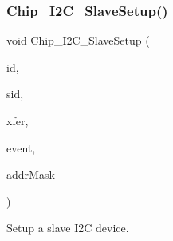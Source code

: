 \subsubsection{\texorpdfstring{Chip\+\_\+\+I2\+C\+\_\+\+Slave\+Setup()}{Chip\_I2C\_SlaveSetup()}}
{\footnotesize\ttfamily void Chip\+\_\+\+I2\+C\+\_\+\+Slave\+Setup (\begin{DoxyParamCaption}\item[{\hyperlink{group___i2_c__18_x_x__43_x_x_ga957556a4d900506cd4cba8427afd81e6}{I2\+C\+\_\+\+I\+D\+\_\+T}}]{id,  }\item[{\hyperlink{group___i2_c__18_x_x__43_x_x_ga5fb1ba338fb3822bb6ca012adc4194bf}{I2\+C\+\_\+\+S\+L\+A\+V\+E\+\_\+\+ID}}]{sid,  }\item[{\hyperlink{struct_i2_c___x_f_e_r___t}{I2\+C\+\_\+\+X\+F\+E\+R\+\_\+T} $\ast$}]{xfer,  }\item[{\hyperlink{group___i2_c__18_x_x__43_x_x_gaef152f4dc1487d90573810007489082e}{I2\+C\+\_\+\+E\+V\+E\+N\+T\+H\+A\+N\+D\+L\+E\+R\+\_\+T}}]{event,  }\item[{uint8\+\_\+t}]{addr\+Mask }\end{DoxyParamCaption})}



Setup a slave I2C device. 


